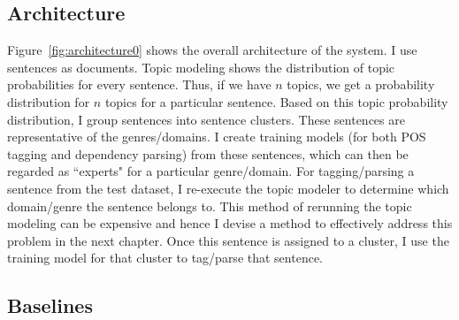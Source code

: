 \subsection{Architecture}



Figure~\ref{fig:architecture0} shows the overall architecture of the system. 
I use sentences as documents. %
Topic modeling shows the distribution of topic probabilities for every sentence. Thus, if we have $n$ topics, we get a probability distribution for $n$ topics for a particular sentence. Based on this topic probability distribution, I group sentences into sentence clusters. These sentences are representative of the genres/domains. I create training models (for both POS tagging and dependency parsing) from these sentences, which can then be regarded as ``experts" for a particular genre/domain. For tagging/parsing a sentence from the test dataset, I re-execute the topic modeler to determine which domain/genre the sentence belongs to. This method of rerunning the topic modeling can be expensive and hence I devise a method to effectively address this problem in the next chapter. Once this sentence is assigned to a cluster, I use the training model for that cluster to tag/parse that sentence.







\subsection{Baselines}

